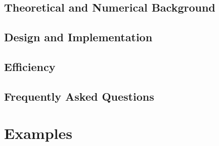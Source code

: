 \documentclass[letterpaper]{book}
\begin{document}



\chapter{Theoretical and Numerical Background}
\label{chap:Numerics}





\chapter{Design and Implementation}
\label{chap:Design}





\chapter{Efficiency}




\chapter{Frequently Asked Questions}
\label{chap:FAQ}




% 
% 
% 



\sloppy

\part{Examples}
\label{part:Examples}


\end{document}
